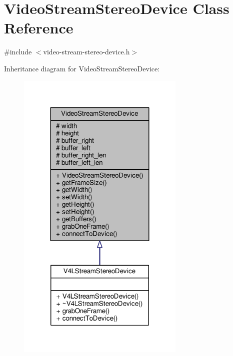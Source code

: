 \hypertarget{classVideoStreamStereoDevice}{}\section{Video\+Stream\+Stereo\+Device Class Reference}
\label{classVideoStreamStereoDevice}


{\ttfamily \#include $<$video-\/stream-\/stereo-\/device.\+h$>$}



Inheritance diagram for Video\+Stream\+Stereo\+Device\+:
\nopagebreak
\begin{figure}[H]
\begin{center}
\leavevmode
\includegraphics[width=227pt]{classVideoStreamStereoDevice__inherit__graph}
\end{center}
\end{figure}


